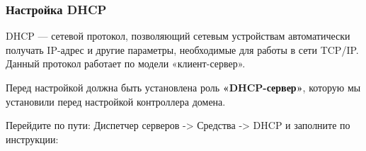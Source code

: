 \documentclass[a4paper, 12pt]{report}
\begin{document}
	\begin{figure}[h]
		\label{fig:image}
	\end{figure}
	
	\clearpage
	
	\subsubsection{Настройка DHCP}
	
	DHCP — сетевой протокол, позволяющий сетевым устройствам автоматически получать IP-адрес и другие параметры, необходимые для работы в сети TCP/IP. Данный протокол работает по модели «клиент-сервер».
	
	Перед настройкой должна быть установлена роль \textbf{«DHCP-сервер»}, которую мы установили перед настройкой контроллера домена.
	
	Перейдите по пути: Диспетчер серверов -> Средства -> DHCP и заполните по инструкции:
	
	\begin{figure}[h]
		\label{fig:image}
	\end{figure}
\end{document}
